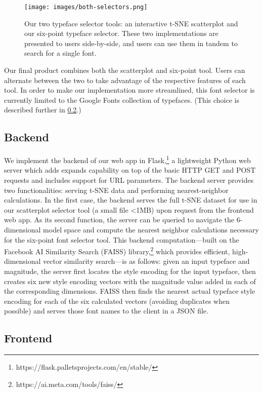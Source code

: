 \begin{figure}[h]
    \centering
    \texttt{[image: images/both-selectors.png]}
    \caption{Our two typeface selector tools: an interactive t-SNE scatterplot and our six-point typeface selector. These two implementations are presented to users side-by-side, and users can use them in tandem to search for a single font.}
    \label{fig:both-selectors}
\end{figure}

Our final product combines both the scatterplot and six-point tool. Users can alternate between the two to take advantage of the respective features of each tool. In order to make our implementation more streamlined, this font selector is currently limited to the Google Fonts collection of typefaces. (This choice is described further in \ref{frontend}.)

\subsection{Backend}

We implement the backend of our web app in Flask,\footnote{https://flask.palletsprojects.com/en/stable/} a lightweight Python web server which adds expands capability on top of the basic HTTP GET and POST requests and includes support for URL parameters. The backend server provides two functionalities: serving t-SNE data and performing nearest-neighbor calculations. In the first case, the backend serves the full t-SNE dataset for use in our scatterplot selector tool (a small file <1MB) upon request from the frontend web app. As its second function, the server can be queried to navigate the 6-dimensional model space and compute the nearest neighbor calculations necessary for the six-point font selector tool. This backend computation—built on the Facebook AI Similarity Search (FAISS) library,\footnote{https://ai.meta.com/tools/faiss/} which provides efficient, high-dimensional vector similarity search—is as follows: given an input typeface and magnitude, the server first locates the style encoding for the input typeface, then creates six new style encoding vectors with the magnitude value added in each of the corresponding dimensions. FAISS then finds the nearest actual typeface style encoding for each of the six calculated vectors (avoiding duplicates when possible) and serves those font names to the client in a JSON file.

\subsection{Frontend} \label{frontend}


